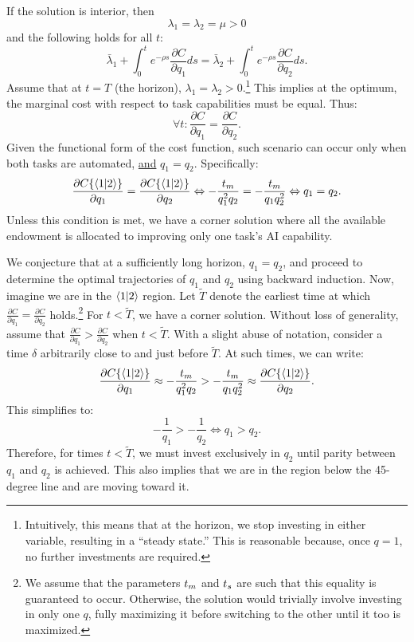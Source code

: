 \documentclass{article}
\theoremstyle{plain}
\theoremstyle{plain}
\begin{document}
If the solution is interior, then  
\[
\lambda_{1}=\lambda_{2}=\mu>0
\]
and the following holds for all $t$:
\[
\bar{\lambda}_{1}+\int_{0}^{t}e^{-\rho s}\frac{\partial C}{\partial q_{1}}ds=\bar{\lambda}_{2}+\int_{0}^{t}e^{-\rho s}\frac{\partial C}{\partial q_{2}}ds.
\]
Assume that at $t=T$ (the horizon), $\lambda_{1}=\lambda_{2}>0$.\footnote{Intuitively, this means that at the horizon, we stop investing in either variable, resulting in a ``steady state.''  
This is reasonable because, once $q=1$, no further investments are required.}  
This implies at the optimum, the marginal cost with respect to task capabilities must be equal.  
Thus:
\[
\forall t:\frac{\partial C}{\partial q_{1}}=\frac{\partial C}{\partial q_{2}}.
\]
Given the functional form of the cost function, such scenario can occur only when both tasks are automated, \underline{and} $q_{1}=q_{2}$.  
Specifically:
\[
\frac{\partial C\{\langle 1|2 \rangle\}}{\partial q_{1}}=\frac{\partial C\{\langle 1|2 \rangle\}}{\partial q_{2}}\Leftrightarrow-\frac{t_{m}}{q_{1}^{2}q_{2}}=-\frac{t_{m}}{q_{1}q_{2}^{2}}\Leftrightarrow q_{1}=q_{2}.
\]
Unless this condition is met, we have a corner solution where all the available endowment is allocated to improving only one task’s AI capability.

We conjecture that at a sufficiently long horizon, $q_{1}=q_{2}$, and proceed to determine the optimal trajectories of $q_{1}$ and $q_{2}$ using backward induction.  
Now, imagine we are in the $\langle 1|2 \rangle$ region.  
Let $\tilde{T}$ denote the earliest time at which $\frac{\partial C}{\partial q_{1}}=\frac{\partial C}{\partial q_{2}}$ holds.\footnote{We assume that the parameters $t_{m}$ and $t_{s}$ are such that this equality is guaranteed to occur.  
Otherwise, the solution would trivially involve investing in only one $q$, fully maximizing it before switching to the other until it too is maximized.}  
For $t<\tilde{T}$, we have a corner solution.  
Without loss of generality, assume that $\frac{\partial C}{\partial q_{1}}>\frac{\partial C}{\partial q_{2}}$ when $t<\tilde{T}$.  
With a slight abuse of notation, consider a time $\delta$ arbitrarily close to and just before $\tilde{T}$.  
At such times, we can write:
\[
\frac{\partial C\{\langle 1|2 \rangle\}}{\partial q_{1}}\approx-\frac{t_{m}}{q_{1}^{2}q_{2}}>-\frac{t_{m}}{q_{1}q_{2}^{2}}\approx\frac{\partial C\{\langle 1|2 \rangle\}}{\partial q_{2}}.
\]
This simplifies to:
\[
-\frac{1}{q_{1}}>-\frac{1}{q_{2}}\Leftrightarrow q_{1}>q_{2}.
\]
Therefore, for times $t<\tilde{T}$, we must invest exclusively in $q_{2}$ until parity between $q_{1}$ and $q_{2}$ is achieved.  
This also implies that we are in the region below the 45-degree line and are moving toward it.
\end{document}
